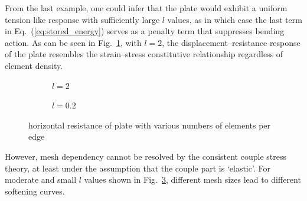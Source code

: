 \documentclass[3p,sort&compress,11pt,fleqn,review]{elsarticle}
\newcommand*{\figref}[1]{Fig.~\ref{#1}}
\newcommand*{\eqsref}[1]{Eq.~(\ref{#1})}
\begin{document}
From the last example, one could infer that the plate would exhibit a uniform tension like response with sufficiently large $l$ values, as in which case the last term in \eqsref{eq:stored_energy} serves as a penalty term that suppresses bending action. As can be seen in \figref{fig:plate_resistance_large_l}, with $l=\num{2}$, the displacement--resistance response of the plate resembles the strain--stress constitutive relationship regardless of element density.
\begin{figure}[ht]
\centering\footnotesize
\begin{subfigure}[b]{.48\textwidth}\centering

\caption{$l=\num{2}$}\label{fig:plate_resistance_large_l}
\end{subfigure}\hfill
\begin{subfigure}[b]{.48\textwidth}\centering

\caption{$l=\num{0.2}$}\label{fig:plate_resistance_small_l}
\end{subfigure}
\caption{horizontal resistance of plate with various numbers of elements per edge}
\end{figure}
However, mesh dependency cannot be resolved by the consistent couple stress theory, at least under the assumption that the couple part is `elastic'. For moderate and small $l$ values shown in \figref{fig:plate_resistance_small_l}, different mesh sizes lead to different softening curves.
\end{document}
